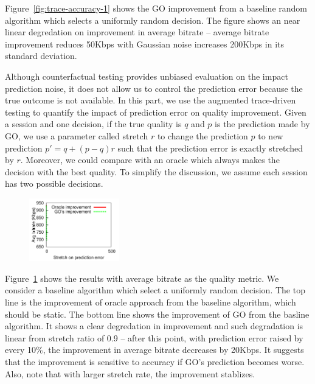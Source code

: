 Figure~\ref{fig:trace-accuracy-1} shows the GO improvement from a baseline random algorithm which selects a uniformly random decision. The figure shows an near linear degredation on improvement in average bitrate -- average bitrate improvement reduces 50Kbps with Gaussian noise increases 200Kbps in its standard deviation.



Although counterfactual testing provides unbiased evaluation on the impact prediction noise, it does not allow us to control the prediction error because the true outcome is not available. In this part, we use the augmented trace-driven testing to quantify the impact of prediction error on quality improvement. Given a session and one decision, if the true quality is $q$ and $p$ is the prediction made by GO, we use a parameter called stretch $r$ to change the prediction $p$ to new prediction $p'=q+(p-q)r$ such that the prediction error is exactly stretched by $r$. 
Moreover, we could compare with an oracle which always makes the decision with the best quality. To simplify the discussion, we assume each session has two  possible decisions. 

\begin{figure}[h!]
\centering
 \includegraphics[width=0.35\textwidth] {figures/newfig/trendAccuracy-metricId1-keyGlobal-partition.pdf}
\label{fig:trace-accuracy-2}
\end{figure}

Figure~\ref{fig:trace-accuracy-2} shows the results with average bitrate as the quality metric. We consider a baseline algorithm which select a uniformly random decision. The top line is the improvement of oracle approach from the baseline algorithm, which should be static. The bottom line shows the improvement of GO from the basline algorithm. 
It shows a clear degredation in improvement and such degradation is linear from stretch ratio of 0.9 -- after this point, with prediction error raised by every 10\%, the improvement in average bitrate decreases by 20Kbps. It suggests that the improvement is sensitive to accuracy if GO's prediction becomes worse. Also, note that with larger stretch rate, the improvement stablizes.

